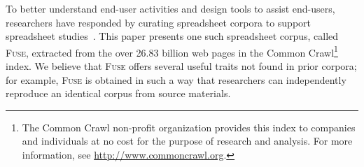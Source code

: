 \documentclass{svjour3}
\begin{document}

To better understand end-user activities and design tools to assist end-users, researchers have responded by curating spreadsheet corpora to support spreadsheet studies~\cite{Fisher2005,Hermans2015,Chen2013}. 
%
This paper presents one such spreadsheet corpus, called \textsc{Fuse}, extracted from the over 26.83 billion web pages in the Common Crawl\footnote{The Common Crawl non-profit organization provides this index to companies and individuals at no cost for the purpose of research and analysis. For more information, see \url{http://www.commoncrawl.org}.} index. 
%
We believe that \textsc{Fuse} offers several useful traits not found in prior corpora; 
for example, \textsc{Fuse} is obtained in such a way that researchers can independently reproduce an identical corpus from source materials.

\end{document}
